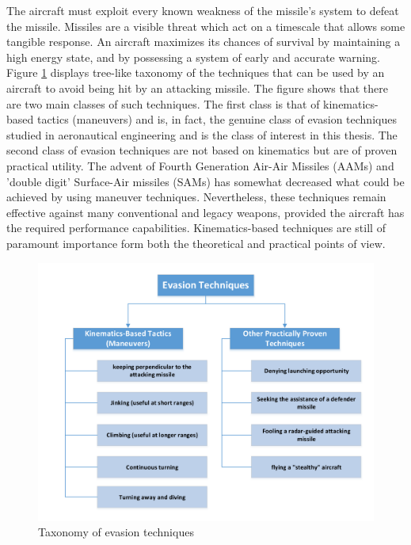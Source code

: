 The aircraft must exploit every known weakness of the missile's system to defeat the missile. Missiles are a visible threat which act on a timescale that allows some tangible response. An aircraft maximizes its chances of survival by maintaining a high energy state, and by possessing a system of early and accurate warning. Figure \ref{Evasion Taxonomy} displays tree-like taxonomy of the techniques that can be used by an aircraft to avoid being hit by an attacking missile. The figure shows that there are two main classes of such techniques. The first class is that of kinematics-based tactics (maneuvers) and is, in fact, the genuine class of evasion techniques studied in aeronautical engineering and is the class of interest in this thesis. The second class of evasion techniques are not based on kinematics but are of proven practical utility.  The advent of Fourth Generation Air-Air Missiles (AAMs) and 'double digit' Surface-Air missiles (SAMs) has somewhat decreased what could be achieved by using maneuver techniques. Nevertheless, these techniques remain effective against many conventional and legacy weapons, provided the aircraft has the required performance capabilities. Kinematics-based techniques are still of paramount importance form both the theoretical and practical points of view.



\begin{figure}[H]
	\centering
	\includegraphics[scale = 0.9]{fig/Evasion.pdf}
	\caption{Taxonomy of evasion techniques}
	\label{Evasion Taxonomy}
\end{figure}


